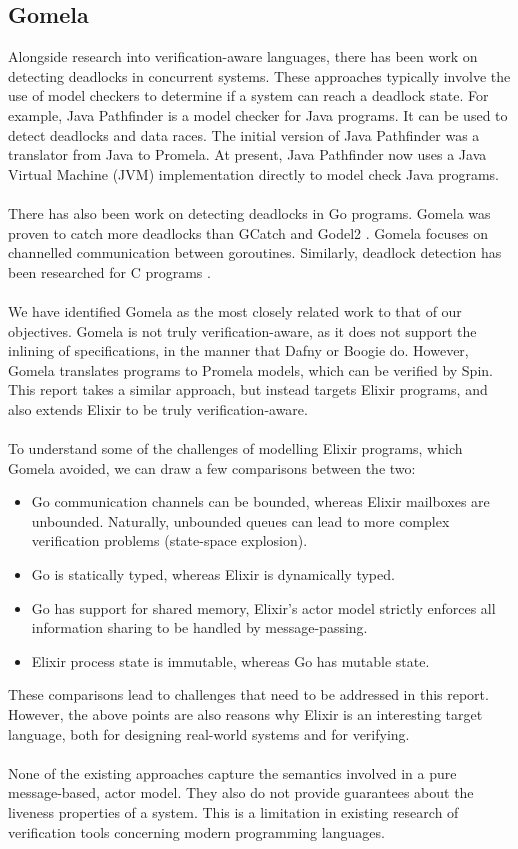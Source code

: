 \subsection{Gomela}
Alongside research into verification-aware languages, there has been work on detecting deadlocks in concurrent systems. These approaches typically involve the use of model checkers to determine if a system can reach a deadlock state. For example, Java Pathfinder \cite{jpf} is a model checker for Java programs. It can be used to detect deadlocks and data races. The initial version of Java Pathfinder was a translator from Java to Promela. At present, Java Pathfinder now uses a Java Virtual Machine (JVM) implementation directly to model check Java programs.
\\ \\
There has also been work on detecting deadlocks in Go programs. Gomela \cite{gomela} was proven to catch more deadlocks than GCatch \cite{gcatch} and Godel2 \cite{godel2}. Gomela focuses on channelled communication between goroutines. Similarly, deadlock detection has been researched for C programs \cite{c_to_promela}. 
\\ \\
We have identified Gomela as the most closely related work to that of our objectives. Gomela is not truly verification-aware, as it does not support the inlining of specifications, in the manner that Dafny or Boogie do. However, Gomela translates programs to Promela models, which can be verified by Spin. This report takes a similar approach, but instead targets Elixir programs, and also extends Elixir to be truly verification-aware.  
\\ \\
To understand some of the challenges of modelling Elixir programs, which Gomela avoided, we can draw a few comparisons between the two:
\begin{itemize}
    \item Go communication channels can be bounded, whereas Elixir mailboxes are unbounded. Naturally, unbounded queues can lead to more complex verification problems (state-space explosion).
    \item Go is statically typed, whereas Elixir is dynamically typed.
    \item Go has support for shared memory, Elixir's actor model strictly enforces all information sharing to be handled by message-passing.
    \item Elixir process state is immutable, whereas Go has mutable state.
\end{itemize}
These comparisons lead to challenges that need to be addressed in this report. However, the above points are also reasons why Elixir is an interesting target language, both for designing real-world systems and for verifying.
\\ \\
None of the existing approaches capture the semantics involved in a pure message-based, actor model. They also do not provide guarantees about the liveness properties of a system. This is a limitation in existing research of verification tools concerning modern programming languages.
